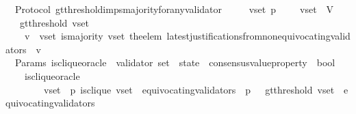 \begin{isabellebody}
\isanewline
\isanewline
{}\isamarkupfalse%
\ {\isacharparenleft}\ Protocol{\isacharparenright}\ gt{\isacharunderscore}threshold{\isacharunderscore}imps{\isacharunderscore}majority{\isacharunderscore}for{\isacharunderscore}any{\isacharunderscore}validator\ {\isacharcolon}\isanewline
\ \ {\isachardoublequoteopen}{\isasymforall}\ {\isasymsigma}\ v{\isacharunderscore}set\ p{\isachardot}\ {\isasymsigma}\ {\isasymin}\ {\isasymSigma}\ {\isasymand}\ v{\isacharunderscore}set\ {\isasymsubseteq}\ V\isanewline
\ \ {\isasymlongrightarrow}\ gt{\isacharunderscore}threshold\ {\isacharparenleft}v{\isacharunderscore}set{\isacharcomma}\ {\isasymsigma}{\isacharparenright}\ \isanewline
\ \ {\isasymlongrightarrow}\ {\isacharparenleft}{\isasymforall}\ v\ {\isasymin}\ v{\isacharunderscore}set{\isachardot}\ is{\isacharunderscore}majority\ {\isacharparenleft}v{\isacharunderscore}set{\isacharcomma}\ the{\isacharunderscore}elem\ {\isacharparenleft}latest{\isacharunderscore}justifications{\isacharunderscore}from{\isacharunderscore}non{\isacharunderscore}equivocating{\isacharunderscore}validators\ {\isasymsigma}\ v{\isacharparenright}{\isacharparenright}{\isacharparenright}{\isachardoublequoteclose}\isanewline
%
\isadelimproof
\ \ %
\endisadelimproof
%
\isatagproof
{}\isamarkupfalse%
%
\endisatagproof
{\isafoldproof}%
%
\isadelimproof
\isanewline
%
\endisadelimproof
\isanewline
\isanewline
{}\isamarkupfalse%
\ {\isacharparenleft}\ Params{\isacharparenright}\ is{\isacharunderscore}clique{\isacharunderscore}oracle\ {\isacharcolon}{\isacharcolon}\ {\isachardoublequoteopen}{\isacharparenleft}validator\ set\ {\isacharasterisk}\ state\ {\isacharasterisk}\ consensus{\isacharunderscore}value{\isacharunderscore}property{\isacharparenright}\ {\isasymRightarrow}\ bool{\isachardoublequoteclose}\isanewline
\ \ \isanewline
\ \ \ \ {\isachardoublequoteopen}is{\isacharunderscore}clique{\isacharunderscore}oracle\ \isanewline
\ \ \ \ \ \ \ {\isacharequal}\ {\isacharparenleft}{\isasymlambda}{\isacharparenleft}v{\isacharunderscore}set{\isacharcomma}\ {\isasymsigma}{\isacharcomma}\ p{\isacharparenright}{\isachardot}\ {\isacharparenleft}is{\isacharunderscore}clique\ {\isacharparenleft}v{\isacharunderscore}set\ {\isacharminus}\ {\isacharparenleft}equivocating{\isacharunderscore}validators\ {\isasymsigma}{\isacharparenright}{\isacharcomma}\ p{\isacharcomma}\ {\isasymsigma}{\isacharparenright}\ {\isasymand}\ gt{\isacharunderscore}threshold\ {\isacharparenleft}v{\isacharunderscore}set\ {\isacharminus}\ {\isacharparenleft}equivocating{\isacharunderscore}validators\ {\isasymsigma}{\isacharparenright}{\isacharcomma}\ {\isasymsigma}{\isacharparenright}{\isacharparenright}{\isacharparenright}{\isachardoublequoteclose}\isanewline

\end{isabellebody}
